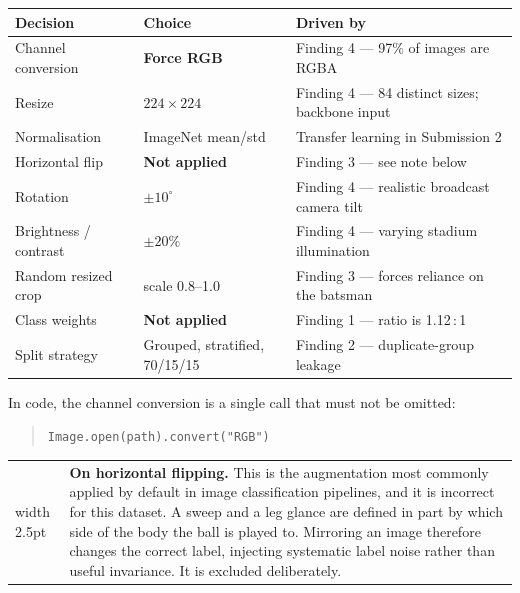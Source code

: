 \documentclass[11pt,a4paper]{article}
\makeatletter
\newenvironment{warnbox}
  {\par\medskip\noindent\begin{tabular}{@{}p{0.3em}@{\hspace{0.8em}}p{\dimexpr\linewidth-2.2em}@{}}
   {\color{warn}\vrule width 2.5pt} &}
  {\end{tabular}\par\medskip}
\makeatother
\begin{document}
\begin{tabularx}{\linewidth}{@{}p{4.0cm}p{4.0cm}X@{}}
\toprule
\textbf{Decision} & \textbf{Choice} & \textbf{Driven by} \\
\midrule
Channel conversion & \textbf{Force RGB} & Finding 4 --- 97\% of images are RGBA \\
Resize & $224 \times 224$ & Finding 4 --- 84 distinct sizes; backbone input \\
Normalisation & ImageNet mean/std & Transfer learning in Submission 2 \\
Horizontal flip & \textbf{Not applied} & Finding 3 --- see note below \\
Rotation & $\pm 10^{\circ}$ & Finding 4 --- realistic broadcast camera tilt \\
Brightness / contrast & $\pm 20\%$ & Finding 4 --- varying stadium illumination \\
Random resized crop & scale 0.8--1.0 & Finding 3 --- forces reliance on the batsman \\
Class weights & \textbf{Not applied} & Finding 1 --- ratio is 1.12\,:\,1 \\
Split strategy & Grouped, stratified, 70/15/15 & Finding 2 --- duplicate-group leakage \\
\bottomrule
\end{tabularx}

In code, the channel conversion is a single call that must not be omitted:

\begin{quote}
\texttt{Image.open(path).convert("RGB")}
\end{quote}

\begin{warnbox}
\textbf{On horizontal flipping.} This is the augmentation most commonly applied by
default in image classification pipelines, and it is incorrect for this dataset. A sweep
and a leg glance are defined in part by which side of the body the ball is played to.
Mirroring an image therefore changes the correct label, injecting systematic label noise
rather than useful invariance. It is excluded deliberately.
\end{warnbox}
\end{document}

